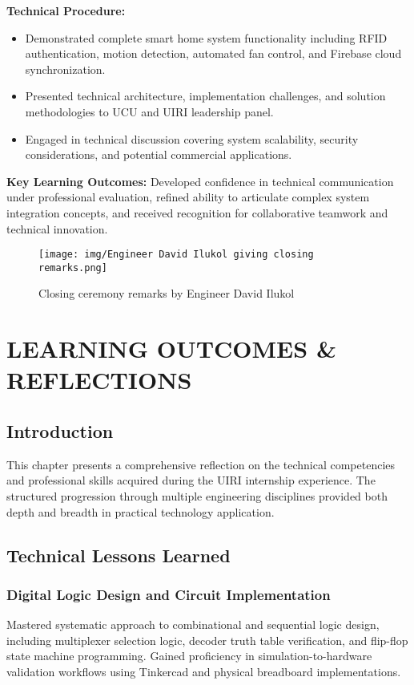 \documentclass[12pt,a4paper]{report}
\begin{document}
\noindent\textbf{Technical Procedure:}
\begin{itemize}
    \item Demonstrated complete smart home system functionality including RFID authentication, motion detection, automated fan control, and Firebase cloud synchronization.
    \item Presented technical architecture, implementation challenges, and solution methodologies to UCU and UIRI leadership panel.
    \item Engaged in technical discussion covering system scalability, security considerations, and potential commercial applications.
\end{itemize}

\noindent\textbf{Key Learning Outcomes:} Developed confidence in technical communication under professional evaluation, refined ability to articulate complex system integration concepts, and received recognition for collaborative teamwork and technical innovation.

\begin{figure}[H]
\centering
\texttt{[image: img/Engineer David Ilukol giving closing remarks.png]}
\caption{Closing ceremony remarks by Engineer David Ilukol}
\label{fig:closing-remarks}
\end{figure}

\newpage
\chapter{LEARNING OUTCOMES \& REFLECTIONS}

\section{Introduction}

\noindent This chapter presents a comprehensive reflection on the technical competencies and professional skills acquired during the UIRI internship experience. The structured progression through multiple engineering disciplines provided both depth and breadth in practical technology application.

\section{Technical Lessons Learned}

\subsection{Digital Logic Design and Circuit Implementation}
\noindent Mastered systematic approach to combinational and sequential logic design, including multiplexer selection logic, decoder truth table verification, and flip-flop state machine programming. Gained proficiency in simulation-to-hardware validation workflows using Tinkercad and physical breadboard implementations.
\end{document}
